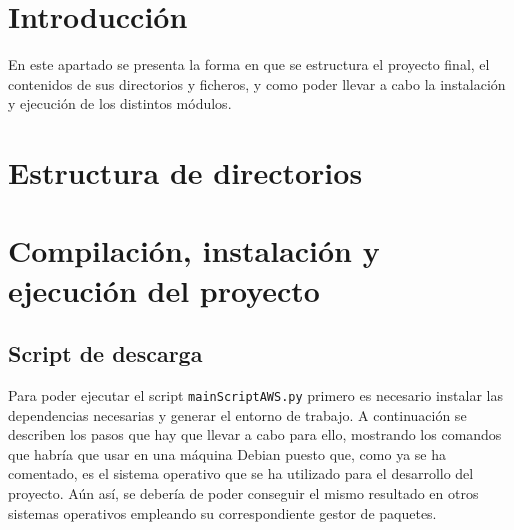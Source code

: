 
\section{Introducción}

En este apartado se presenta la forma en que se estructura el proyecto final, el contenidos de sus directorios y ficheros, y como poder llevar a cabo la instalación y ejecución de los distintos módulos.

\section{Estructura de directorios}


\section{Compilación, instalación y ejecución del proyecto}

\subsection{Script de descarga}

Para poder ejecutar el script \texttt{mainScriptAWS.py} primero es necesario instalar las dependencias necesarias y generar el entorno de trabajo. A continuación se describen los pasos que hay que llevar a cabo para ello, mostrando los comandos que habría que usar en una máquina Debian puesto que, como ya se ha comentado, es el sistema operativo que se ha utilizado para el desarrollo del proyecto. Aún así, se debería de poder conseguir el mismo resultado en otros sistemas operativos empleando su correspondiente gestor de paquetes.

